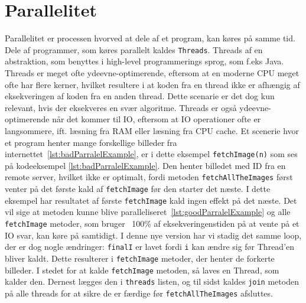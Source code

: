 \section{Parallelitet}\label{ch:parallelitet}
Parallelitet er processen hvorved at dele af et program, kan køres på samme tid. Dele af programmer, som køres parallelt kaldes \texttt{Threads}\cite{JavaThreads}. Threads af en abstraktion, som benyttes i high-level programmerings sprog, som f.eks Java\cite{HighLevel}. Threads er meget ofte ydeevne-optimerende, eftersom at en moderne CPU meget ofte har flere kerner, hvilket resultere i at koden fra en thread ikke er afhængig af eksekveringen af koden fra en anden thread. Dette scenarie er det dog kun relevant, hvis der eksekveres en svær algoritme. Threads er også ydeevne-optimerende når det kommer til IO, eftersom at IO operationer ofte er langsommere, ift. læsning fra RAM eller læsning fra CPU cache\cite{OperatingSystems}. Et scenerie hvor et program henter mange forskellige billeder fra internettet~\ref{lst:badParralelExample}, er i dette eksempel \texttt{fetchImage(n)} som ses på kodeeksempel \ref{lst:badParralelExample}. Den henter billedet med ID fra en remote server, hvilket ikke er optimalt, fordi metoden \texttt{fetchAllTheImages} først venter på det første kald af \texttt{fetchImage} før den starter det næste. I dette eksempel har resultatet af første \texttt{fetchImage} kald ingen effekt på det næste. Det vil sige at metoden kunne blive paralleliseret~\ref{lst:goodParralelExample} og alle \texttt{fetchImage} metoder, som bruger ~100\% af eksekveringenstiden på at vente på et IO svar, kan køre på samtidigt. I denne nye version har vi stadig det samme loop, der er dog nogle ændringer: \texttt{finalI} er lavet fordi \texttt{i} kan ændre sig før Thread'en bliver kaldt. Dette resulterer i \texttt{fetchImage} metoder, der henter de forkerte billeder. I stedet for at kalde \texttt{fetchImage} metoden, så laves en Thread, som kalder den. 
Dernest lægges den i \texttt{threads} listen, og til sidst kaldes \texttt{join} metoden på alle threads for at sikre de er færdige før \texttt{fetchAllTheImages} afsluttes.


